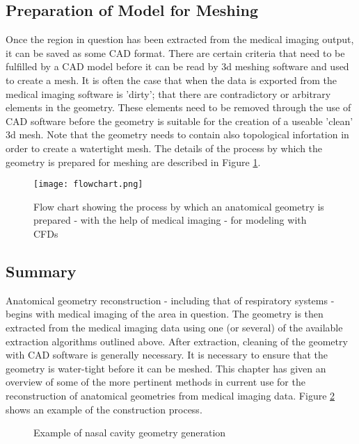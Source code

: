 \subsection{Preparation of Model for Meshing}

Once the region in question has been extracted from the medical imaging output, it can be saved as some CAD format. There are certain criteria that need to be fulfilled by a CAD model before it can be read by 3d meshing software and used to create a mesh. It is often the case that when the data is exported from the medical imaging software is 'dirty'; that there are contradictory or arbitrary elements in the geometry. These elements need to be removed through the use of CAD software before the geometry is suitable for the creation of a useable 'clean' 3d mesh. Note that the geometry needs to contain also topological infortation in order to create a watertight mesh. The details of the process by which the geometry is prepared for meshing are described in Figure \ref{fig:segchart}.


\begin{figure}
  \texttt{[image: flowchart.png]}
\caption{Flow chart showing the process by which an anatomical geometry is prepared - with the help of medical imaging - for modeling with CFDs} \label{fig:segchart}
\centering
\end{figure}

\subsection{Summary}

Anatomical geometry reconstruction - including that of respiratory systems - begins with medical imaging of the area in question. The geometry is then extracted from the medical imaging data using one (or several) of the available extraction algorithms outlined above. After extraction, cleaning of the geometry with CAD software is generally necessary. It is necessary to ensure that the geometry is water-tight before it can be meshed. This chapter has given an overview of some of the more pertinent methods in current use for the reconstruction of anatomical geometries from medical imaging data. Figure \ref{fig:cavzamp} shows an example of the construction process.

\begin{figure}

  \caption{Example of nasal cavity geometry generation}\label{fig:cavzamp}
\end{figure}
 
